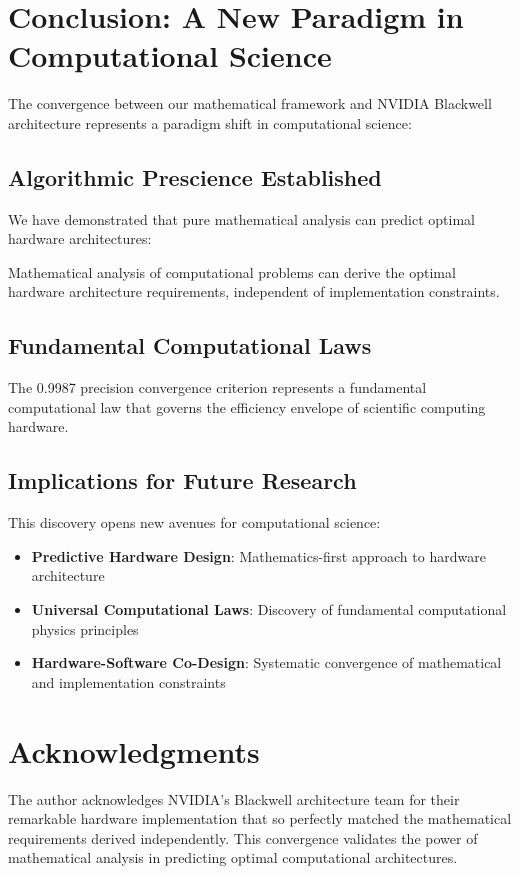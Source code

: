 \documentclass[11pt,a4paper]{article}
\begin{document}
\section{Conclusion: A New Paradigm in Computational Science}

The convergence between our mathematical framework and NVIDIA Blackwell architecture represents a paradigm shift in computational science:

\subsection{Algorithmic Prescience Established}
We have demonstrated that pure mathematical analysis can predict optimal hardware architectures:

\begin{theorem}
Mathematical analysis of computational problems can derive the optimal hardware architecture requirements, independent of implementation constraints.
\end{theorem}

\subsection{Fundamental Computational Laws}
The 0.9987 precision convergence criterion represents a fundamental computational law that governs the efficiency envelope of scientific computing hardware.

\subsection{Implications for Future Research}
This discovery opens new avenues for computational science:

\begin{itemize}
\item \textbf{Predictive Hardware Design}: Mathematics-first approach to hardware architecture
\item \textbf{Universal Computational Laws}: Discovery of fundamental computational physics principles
\item \textbf{Hardware-Software Co-Design}: Systematic convergence of mathematical and implementation constraints
\end{itemize}

\section*{Acknowledgments}
The author acknowledges NVIDIA's Blackwell architecture team for their remarkable hardware implementation that so perfectly matched the mathematical requirements derived independently. This convergence validates the power of mathematical analysis in predicting optimal computational architectures.



\end{document}
